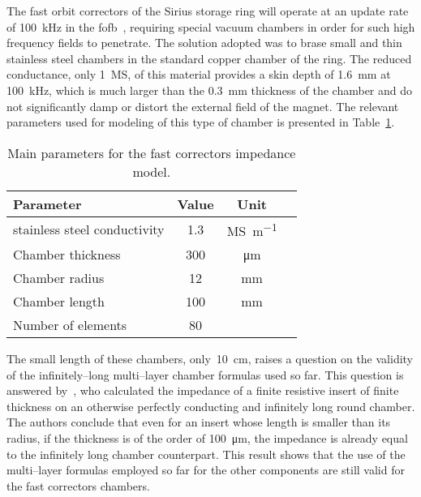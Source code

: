     The fast orbit correctors of the Sirius storage ring will operate at an update rate of \SI{100}{\kilo\hertz} in the \gls{fofb}~\cite{Tavares2013}, requiring special vacuum chambers in order for such high frequency fields to penetrate. The solution adopted was to brase small and thin stainless steel chambers in the standard copper chamber of the ring. The reduced conductance, only \SI{1}{\mega\siemens}, of this material provides a skin depth of \SI{1.6}{\milli\meter} at \SI{100}{\kilo\hertz}, which is much larger than the \SI{0.3}{\milli\meter} thickness of the chamber and do not significantly damp or distort the external field of the magnet. The relevant parameters used for modeling of this type of chamber is presented in Table~\ref{tab:fast_correctors_chamber_parameters}.
    \begin{table}
        \centering
        \caption{Main parameters for the fast correctors impedance model.}
        \label{tab:fast_correctors_chamber_parameters}
        \begin{tabular}{lccc}
            \toprule
            Parameter            & Value      & Unit \\
            \midrule
            stainless steel conductivity      & 1.3  & \si{\mega\siemens\per\meter}\\
            Chamber thickness    & 300  & \si{\micro\meter}\\
            Chamber radius       & 12   & \si{\milli\meter}\\
            Chamber length       & 100  & \si{\milli\meter}\\
            Number of elements   &  80  & \\
            \bottomrule
        \end{tabular}
    \end{table}

    The small length of these chambers, only~\SI{10}{\centi\meter}, raises a question on the validity of the infinitely--long multi--layer chamber formulas used so far. This question is answered by~, who calculated the impedance of a finite resistive insert of finite thickness on an otherwise perfectly conducting and infinitely long round chamber. The authors conclude that even for an insert whose length is smaller than its radius, if the thickness is of the order of \SI{100}{\micro\meter}, the impedance is already equal to the infinitely long chamber counterpart. This result shows that the use of the multi--layer formulas employed so far for the other components are still valid for the fast correctors chambers.

